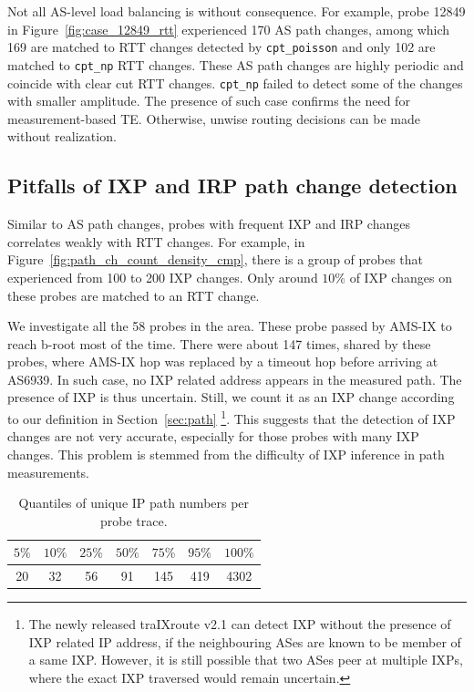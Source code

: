 Not all AS-level load balancing is without consequence. For example, probe 12849 in Figure~\ref{fig:case_12849_rtt} experienced 170 AS path changes, among which 169 are matched to RTT changes detected by \texttt{cpt\_poisson} and only 102 are matched to \texttt{cpt\_np} RTT changes.
These AS path changes are highly periodic and coincide with clear cut RTT changes.
\texttt{cpt\_np} failed to detect some of the changes with smaller amplitude.
The presence of such case confirms the need for measurement-based TE.
Otherwise, unwise routing decisions can be made without realization.

\subsection{Pitfalls of IXP and IRP path change detection}
Similar to AS path changes, probes with frequent IXP and IRP changes correlates weakly with RTT changes.
For example, in Figure~\ref{fig:path_ch_count_density_cmp}, there is a group of probes that experienced from 100 to 200 IXP changes. 
Only around $10\%$ of IXP changes on these probes are matched to an RTT change.

We investigate all the 58 probes in the area. These probe passed by AMS-IX to reach b-root most of the time. There were about 147 times, shared by these probes, where AMS-IX hop was replaced by a timeout hop before arriving at AS6939.
In such case, no IXP related address appears in the measured path. The presence of IXP is thus uncertain.
Still, we count it as an IXP change according to our definition in Section~\ref{sec:path}
\footnote{The newly released traIXroute v2.1 can detect IXP without the presence of IXP related IP address, if the neighbouring ASes are known to be member of a same IXP. However, it is still possible that two ASes peer at multiple IXPs, where the exact IXP traversed would remain uncertain.}.
This suggests that the detection of IXP changes are not very accurate, especially for those probes with many IXP changes.
This problem is stemmed from the difficulty of IXP inference in path measurements.


\begin{table}[!htb]
\caption{Quantiles of unique IP path numbers per probe trace.}
\label{tab:ip_path_count}
\centering
\footnotesize
\setlength{\tabcolsep}{0.5em}
\begin{tabular}{ccccccc}
\toprule
$5\%$ & $10\%$ & $25\%$ & $50\%$ & $75\%$ & $95\%$ & $100\%$\\
\midrule
20 & 32 & 56 & 91 & 145 & 419 & 4302\\
\bottomrule
\end{tabular}
\end{table}

